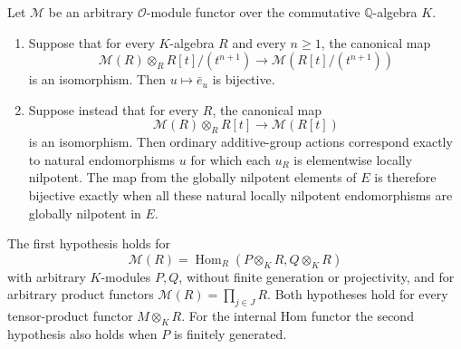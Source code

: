 \begin{theorem}
\label{C:functor-basechange}
Let $\mathcal M$ be an arbitrary $\mathcal O$-module functor over the commutative $\mathbb Q$-algebra $K$.
\begin{enumerate}
\item Suppose that for every $K$-algebra $R$ and every $n\geq1$, the canonical map
\[
 \mathcal M(R)\otimes_R R[t]/(t^{n+1})
       \longrightarrow\mathcal M(R[t]/(t^{n+1}))
\]
is an isomorphism. Then $u\mapsto\bar e_u$ is bijective.
\item Suppose instead that for every $R$, the canonical map
\[
 \mathcal M(R)\otimes_R R[t]\longrightarrow\mathcal M(R[t])
\]
is an isomorphism. Then ordinary additive-group actions correspond exactly to natural endomorphisms $u$ for which each $u_R$ is elementwise locally nilpotent. The map from the globally nilpotent elements of $E$ is therefore bijective exactly when all these natural locally nilpotent endomorphisms are globally nilpotent in $E$.
\end{enumerate}
The first hypothesis holds for
\[
 \mathcal M(R)=\operatorname{Hom}_R(P\otimes_KR,Q\otimes_KR)
\]
with arbitrary $K$-modules $P,Q$, without finite generation or projectivity, and for arbitrary product functors $\mathcal M(R)=\prod_{j\in J}R$. Both hypotheses hold for every tensor-product functor $M\otimes_KR$. For the internal Hom functor the second hypothesis also holds when $P$ is finitely generated.
\end{theorem}

